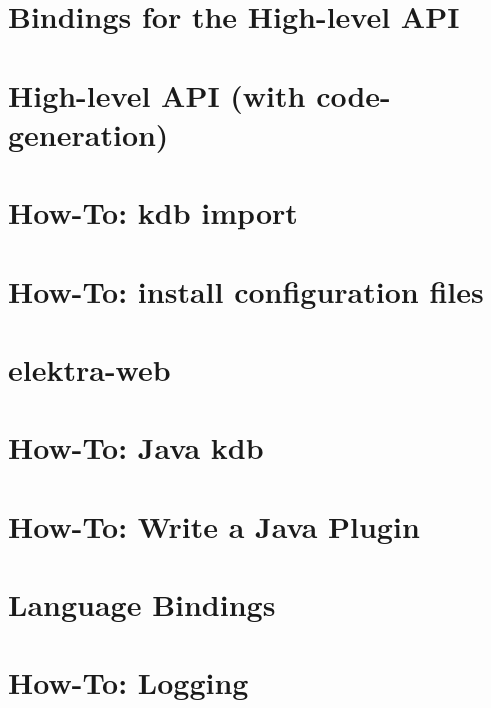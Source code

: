 \let\mypdfximage\pdfximage\def\pdfximage{\immediate\mypdfximage}\documentclass[twoside]{book}
\newcommand{\+}{\discretionary{\mbox{\scriptsize$\hookleftarrow$}}{}{}}
\begin{document}
\chapter{Bindings for the High-\/level API}
\label{doc_tutorials_highlevel-bindings_md}

\chapter{High-\/level API (with code-\/generation)}
\label{doc_tutorials_highlevel_md}

\chapter{How-\/\+To\+: kdb import}
\label{doc_tutorials_import_md}

\chapter{How-\/\+To\+: install configuration files}
\label{doc_tutorials_install-config-files_md}

\chapter{elektra-\/web}
\label{doc_tutorials_install-webui_md}

\chapter{How-\/\+To\+: Java kdb}
\label{doc_tutorials_java-kdb_md}

\chapter{How-\/\+To\+: Write a Java Plugin}
\label{doc_tutorials_java-plugins_md}

\chapter{Language Bindings}
\label{doc_tutorials_language-bindings_md}

\chapter{How-\/\+To\+: Logging}
\label{doc_tutorials_logger_md}

\end{document}
